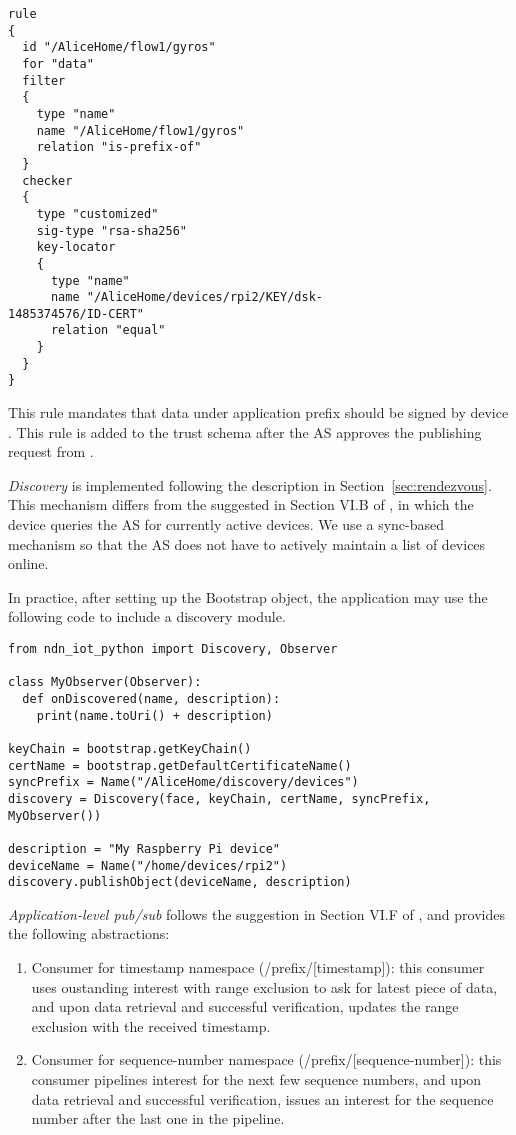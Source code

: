 \begin{verbatim}
rule 
{
  id "/AliceHome/flow1/gyros"
  for "data"
  filter 
  {
    type "name"
    name "/AliceHome/flow1/gyros"
    relation "is-prefix-of"
  }
  checker 
  {
    type "customized"
    sig-type "rsa-sha256"
    key-locator 
    {
      type "name"
      name "/AliceHome/devices/rpi2/KEY/dsk-
1485374576/ID-CERT"
      relation "equal"
    }
  }
}
\end{verbatim}
This rule mandates that data under application prefix  should be signed by device .
This rule is added to the trust schema after the AS approves the publishing request from .

\emph{Discovery} is implemented following the description in Section~\ref{sec:rendezvous}. 
This mechanism differs from the suggested in Section VI.B of \cite{ndn-iot}, in which the device queries the AS for currently active devices.
We use a sync-based mechanism so that the AS does not have to actively maintain a list of devices online.

In practice, after setting up the Bootstrap object, the application may use the following code to include a discovery module.
\begin{verbatim}
from ndn_iot_python import Discovery, Observer

class MyObserver(Observer):
  def onDiscovered(name, description):
    print(name.toUri() + description)

keyChain = bootstrap.getKeyChain()
certName = bootstrap.getDefaultCertificateName()
syncPrefix = Name("/AliceHome/discovery/devices")
discovery = Discovery(face, keyChain, certName, syncPrefix, MyObserver())

description = "My Raspberry Pi device"
deviceName = Name("/home/devices/rpi2")
discovery.publishObject(deviceName, description)
\end{verbatim}

\emph{Application-level pub/sub} follows the suggestion in Section VI.F of \cite{ndn-iot}, and provides the following abstractions:
\begin{enumerate}
\item Consumer for timestamp namespace (/prefix/[timestamp]): this consumer uses oustanding interest with range exclusion to ask for latest piece of data, and upon data retrieval and successful verification, updates the range exclusion with the received timestamp.
\item Consumer for sequence-number namespace (/prefix/[sequence-number]): this consumer pipelines interest for the next few sequence numbers, and upon data retrieval and successful verification, issues an interest for the sequence number after the last one in the pipeline.
\end{enumerate}

